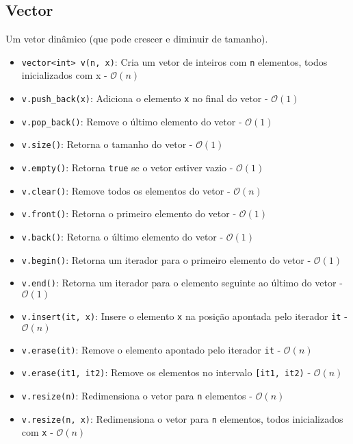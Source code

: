 \documentclass[10pt, a4paper, oneside]{book}
\begin{document}
\subsection{Vector}

Um vetor dinâmico (que pode crescer e diminuir de tamanho).

\begin{itemize}
    \item \texttt{vector<int> v(n, x)}: Cria um vetor de inteiros com \texttt{n} elementos, todos inicializados com x - $\mathcal{O}(n)$
    \item \texttt{v.push\_back(x)}: Adiciona o elemento \texttt{x} no final do vetor - $\mathcal{O}(1)$
    \item \texttt{v.pop\_back()}: Remove o último elemento do vetor - $\mathcal{O}(1)$
    \item \texttt{v.size()}: Retorna o tamanho do vetor - $\mathcal{O}(1)$
    \item \texttt{v.empty()}: Retorna \texttt{true} se o vetor estiver vazio - $\mathcal{O}(1)$
    \item \texttt{v.clear()}: Remove todos os elementos do vetor - $\mathcal{O}(n)$
    \item \texttt{v.front()}: Retorna o primeiro elemento do vetor - $\mathcal{O}(1)$
    \item \texttt{v.back()}: Retorna o último elemento do vetor - $\mathcal{O}(1)$
    \item \texttt{v.begin()}: Retorna um iterador para o primeiro elemento do vetor - $\mathcal{O}(1)$
    \item \texttt{v.end()}: Retorna um iterador para o elemento seguinte ao último do vetor - $\mathcal{O}(1)$
    \item \texttt{v.insert(it, x)}: Insere o elemento \texttt{x} na posição apontada pelo iterador \texttt{it} - $\mathcal{O}(n)$
    \item \texttt{v.erase(it)}: Remove o elemento apontado pelo iterador \texttt{it} - $\mathcal{O}(n)$
    \item \texttt{v.erase(it1, it2)}: Remove os elementos no intervalo \texttt{[it1, it2)} - $\mathcal{O}(n)$
    \item \texttt{v.resize(n)}: Redimensiona o vetor para \texttt{n} elementos - $\mathcal{O}(n)$
    \item \texttt{v.resize(n, x)}: Redimensiona o vetor para \texttt{n} elementos, todos inicializados com \texttt{x} - $\mathcal{O}(n)$
\end{itemize}
\end{document}
